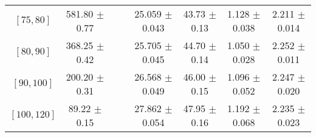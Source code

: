 \begin{tabular}{c||c|c|c|c|c|c|c}
$[75, 80]$ & 581.80 $\pm$ 0.77 &  &  & 25.059 $\pm$ 0.043 & 43.73 $\pm$ 0.13 & 1.128 $\pm$ 0.038 & 2.211 $\pm$ 0.014\\
$[80, 90]$ & 368.25 $\pm$ 0.42 &  &  & 25.705 $\pm$ 0.045 & 44.70 $\pm$ 0.14 & 1.050 $\pm$ 0.028 & 2.252 $\pm$ 0.011\\
$[90, 100]$ & 200.20 $\pm$ 0.31 &  &  & 26.568 $\pm$ 0.049 & 46.00 $\pm$ 0.15 & 1.096 $\pm$ 0.052 & 2.247 $\pm$ 0.020\\
$[100, 120]$ & 89.22 $\pm$ 0.15 &  &  & 27.862 $\pm$ 0.054 & 47.95 $\pm$ 0.16 & 1.192 $\pm$ 0.068 & 2.235 $\pm$ 0.023\\
\end{tabular}
